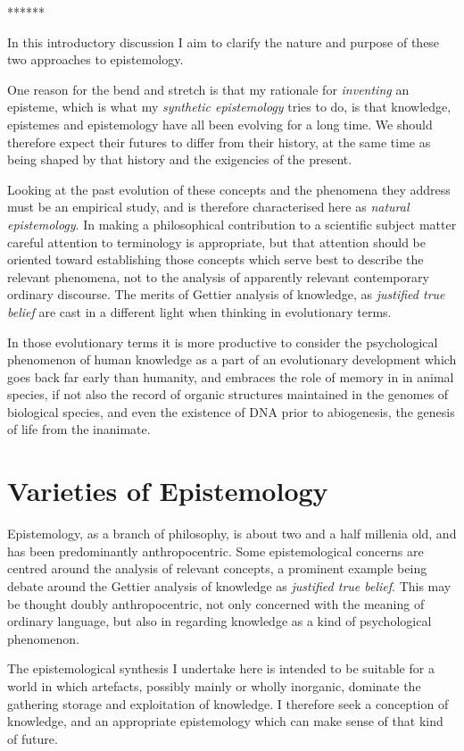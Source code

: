 \documentclass[10pt,titlepage]{book}
\begin{document}
******

In this introductory discussion I aim to clarify the nature and purpose of these two approaches to epistemology.

One reason for the bend and stretch is that my rationale for \emph{inventing} an episteme, which is what my \emph{synthetic epistemology} tries to do, is that knowledge, epistemes and epistemology have all been evolving for a long time.
We should therefore expect their futures to differ from their history, at the same time as being shaped by that history and the exigencies of the present.

Looking at the past evolution of these concepts and the phenomena they address must be an empirical study, and is therefore characterised here as \emph{natural epistemology}.
In making a philosophical contribution to a scientific subject matter careful attention to terminology is appropriate, but that attention should be oriented toward establishing those concepts which serve best to describe the relevant phenomena, not to the analysis of apparently relevant contemporary ordinary discourse.
The merits of Gettier analysis of knowledge, as \emph{justified true belief} are cast in a different light when thinking in evolutionary terms.

In those evolutionary terms it is more productive to consider the psychological phenomenon of human knowledge as a part of an evolutionary development which goes back far early than humanity, and embraces the role of memory in in animal species, if not also the record of organic structures maintained in the genomes of biological species, and even the existence of DNA prior to abiogenesis, the genesis of life from the inanimate.

\section{Varieties of Epistemology}

Epistemology, as a branch of philosophy, is about two and a half millenia old, and has been predominantly anthropocentric.
Some epistemological concerns are centred around the analysis of relevant concepts, a prominent example being debate around the Gettier analysis of knowledge as \emph{justified true belief}.
This may be thought doubly anthropocentric, not only concerned with the meaning of ordinary language, but also in regarding knowledge as a kind of psychological phenomenon.

The epistemological synthesis I undertake here is intended to be suitable for a world in which artefacts, possibly mainly or wholly inorganic, dominate the gathering storage and exploitation of knowledge.
I therefore seek a conception of knowledge, and an appropriate epistemology which can make sense of that kind of future.
\end{document}
